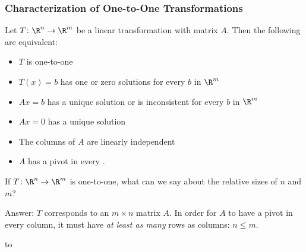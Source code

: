 
\begin{frame}
\frametitle{Characterization of One-to-One Transformations}

\vskip -3mm
\begin{thm}
  Let $T\colon\R^n\to\R^m$ be a linear transformation with matrix $A$.  Then the
  following are equivalent:
  \begin{itemize}
  \item $T$ is one-to-one
    \pause
  \item $T(x) = b$ has one or zero solutions for every $b$ in $\R^m$
    \pause
  \item $Ax = b$ has a unique solution or is inconsistent for every $b$ in $\R^m$
    \pause
  \item $Ax = 0$ has a unique solution
    \pause
  \item The columns of $A$ are linearly independent
    \pause
  \item $A$ has a pivot in every .
  \end{itemize}
\end{thm}

\pause[8]

\begin{ques}
  If $T\colon\R^n\to\R^m$ is one-to-one, what can we say about the relative sizes of
  $n$ and $m$?
\end{ques}

\pause
\alert{Answer:} $T$ corresponds to an $m\times n$ matrix $A$.
\pause
In order for $A$ to have a pivot in every column, it must have
\emph{at least as many} rows as columns: $n\leq m$.

\pause
\hbox to 

\end{frame}


